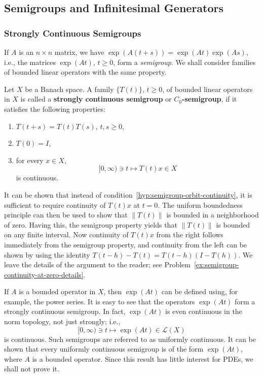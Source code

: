 \subsection{Semigroups and Infinitesimal Generators}\label{sec:semigroups-infinitesimal-generators}

\subsubsection{Strongly Continuous Semigroups}\label{subsec:strongly-continuous-semigroups}

If $A$ is an $n\times n$ matrix, we have $\exp(A(t+s))=\exp(At)\exp(As)$, i.e., the matrices $\exp(At)$, $t\geq0$, form a \emph{semigroup}. We shall consider families of bounded linear operators with the same property.

\begin{Definition}
\label{def:strongly-continuous-semigroup}
Let $X$ be a Banach space. A family $\{T(t)\}$, $t\geq0$, of bounded linear operators in $X$ is called a \textbf{strongly continuous semigroup} or \textbf{$C_0$-semigroup}, if it satisfies the following properties:\begin{enumerate}\item\label{hyp:semigroup-composition-law} $T(t+s)=T(t)T(s)$, $t,s\geq0$,\item\label{hyp:semigroup-zero-identity} $T(0)=I$,\item\label{hyp:semigroup-orbit-continuity} for every $x\in X$,\[[0,\infty)\ni t\mapsto T(t)x\in X\]is continuous.\end{enumerate}
\end{Definition}

\begin{Remark}
\label{rem:semigroup-continuity-at-zero}
It can be shown that instead of condition~\ref{hyp:semigroup-orbit-continuity}, it is sufficient to require continuity of $T(t)x$ at $t=0$. The uniform boundedness principle can then be used to show that $\|T(t)\|$ is bounded in a neighborhood of zero. Having this, the semigroup property yields that $\|T(t)\|$ is bounded on any finite interval. Now continuity of $T(t)x$ from the right follows immediately from the semigroup property, and continuity from the left can be shown by using the identity $T(t-h)-T(t)=T(t-h)(I-T(h))$. We leave the details of the argument to the reader; see Problem~\ref{ex:semigroup-continuity-at-zero-details}.
\end{Remark}

\begin{Example}
\label{ex:bounded-generator-uniformly-continuous-semigroup}
If $A$ is a bounded operator in $X$, then $\exp(At)$ can be defined using, for example, the power series. It is easy to see that the operators $\exp(At)$ form a strongly continuous semigroup. In fact, $\exp(At)$ is even continuous in the norm topology, not just strongly; i.e.,\[[0,\infty)\ni t\mapsto\exp(At)\in\mathcal{L}(X)\]is continuous. Such semigroups are referred to as uniformly continuous. It can be shown that every uniformly continuous semigroup is of the form $\exp(At)$, where $A$ is a bounded operator. Since this result has little interest for PDEs, we shall not prove it.
\end{Example}

